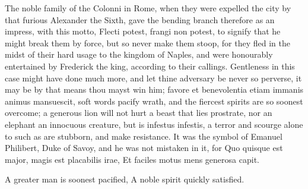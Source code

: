 {The noble family of the Colonni in Rome, when they were expelled the
city by that furious Alexander the Sixth, gave the bending branch
therefore as an impress, with this motto, Flecti potest, frangi non
potest, to signify that he might break them by force, but so never make
them stoop, for they fled in the midst of their hard usage to the
kingdom of Naples, and were honourably entertained by Frederick the
king, according to their callings. Gentleness in this case might have
done much more, and let thine adversary be never so perverse, it may be
by that means thou mayst win him;  favore et benevolentia etiam
immanis animus mansuescit, soft words pacify wrath, and the fiercest
spirits are so soonest overcome; a generous lion will not hurt a
beast that lies prostrate, nor an elephant an innocuous creature, but
is infestus infestis, a terror and scourge alone to such as are
stubborn, and make resistance. It was the symbol of Emanuel Philibert,
Duke of Savoy, and he was not mistaken in it, for
Quo quisque est major, magis est placabilis irae,
Et faciles motus mens generosa capit.

A greater man is soonest pacified,
A noble spirit quickly satisfied.

}
